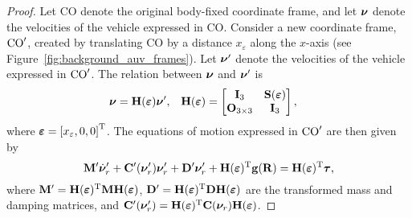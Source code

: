 \begin{proof}
    Let CO denote the original body-fixed coordinate frame, and let $\bm{\nu}$ denote the velocities of the vehicle expressed in CO.
    Consider a new coordinate frame, ${\rm CO}^{\prime}$, created by translating CO by a distance $x_{\varepsilon}$ along the $x$-axis (see Figure~\ref{fig:background_auv_frames}).
    Let $\bm{\nu}^{\prime}$ denote the velocities of the vehicle expressed in ${\rm CO}^{\prime}$.
    The relation between $\bm{\nu}$ and $\bm{\nu}^{\prime}$ is
    \begin{align}
        \bm{\nu} &= \mathbf{H}(\bm{\varepsilon}) \bm{\nu}^{\prime}, &
        \mathbf{H}(\bm{\varepsilon}) &=
        \begin{bmatrix}
            \mathbf{I}_3 & \mathbf{S}(\bm{\varepsilon}) \\
            \mathbf{O}_{3 \times 3} & \mathbf{I}_3
        \end{bmatrix},
    \end{align}
    where $\bm{\varepsilon} = \left[x_{\varepsilon}, 0, 0\right]^{\mathrm{T}}$.
    The equations of motion expressed in ${\rm CO}^{\prime}$ are then given by \cite{fossen_handbook_2011}
    \begin{equation}
        \mathbf{M}^{\prime}\dot{\bm{\nu}}_r^{\prime} + \mathbf{C}^{\prime}(\bm{\nu}^{\prime}_r)\bm{\nu}^{\prime}_r + \mathbf{D}^{\prime}\bm{\nu}^{\prime}_r + \mathbf{H}(\bm{\varepsilon})^{\mathrm{T}}\mathbf{g}(\mathbf{R}) = \mathbf{H}(\bm{\varepsilon})^{\mathrm{T}}\bm{\tau},
    \end{equation}
    where $\mathbf{M}^{\prime} = \mathbf{H}(\bm{\varepsilon})^{\mathrm{T}} \mathbf{M} \mathbf{H}(\bm{\varepsilon})$, $\mathbf{D}^{\prime} = \mathbf{H}(\bm{\varepsilon})^{\mathrm{T}} \mathbf{D} \mathbf{H}(\bm{\varepsilon})$ are the transformed mass and damping matrices, and $\mathbf{C}^{\prime}(\bm{\nu}^{\prime}_r) = \mathbf{H}(\bm{\varepsilon})^{\mathrm{T}}\mathbf{C}(\bm{\nu}_r)\mathbf{H}(\bm{\varepsilon})$.


\end{proof}
